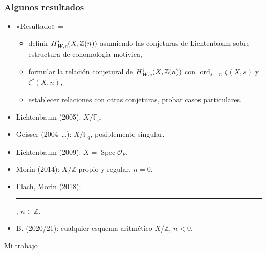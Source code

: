 \documentclass[handout]{beamer}
\newcommand{\FF}{\mathbb{F}}
\newcommand{\ZZ}{\mathbb{Z}}
\DeclareMathOperator{\ord}{ord}
\DeclareMathOperator{\Spec}{Spec}
\newcommand{\Wc}{\text{\it W,c}}
\begin{document}
\begin{frame}
  \frametitle{Algunos resultados}

  \begin{itemize}
  \item<2-> «Resultado» =
    \begin{itemize}
    \item<3-> definir $H^i_\Wc (X, \ZZ(n))$ asumiendo las conjeturas de
      Lichtenbaum sobre estructura de cohomología motívica,
    \item<4-> formular la relación conjetural de $H^i_\Wc (X, \ZZ(n))$ con
      $\ord_{s=n} \zeta (X,s)$ y $\zeta^* (X,n)$,
    \item<5-> establecer relaciones con otras conjeturas, probar casos
      particulares.
    \end{itemize}

  \item<6-> Lichtenbaum (2005): $X/\FF_q$.

  \item<7-> Geisser (2004--\dots): $X/\FF_q$, posiblemente singular.

  \item<8-> Lichtenbaum (2009): $X = \Spec \mathcal{O}_F$.

  \item<9-> Morin (2014): $X/\ZZ$ propio y regular, $n = 0$.

  \item<10-> Flach, Morin (2018): \rule[0.25em]{2.3cm}{0.6pt}, $n \in \ZZ$.

  \item<11-> B. (2020/21): cualquier esquema aritmético $X/\ZZ$, $n < 0$.
  \end{itemize}
\end{frame}


\begin{frame}[plain]
  \headingfont

  \begin{center}
    {\huge Mi trabajo}
  \end{center}
\end{frame}

\end{document}
